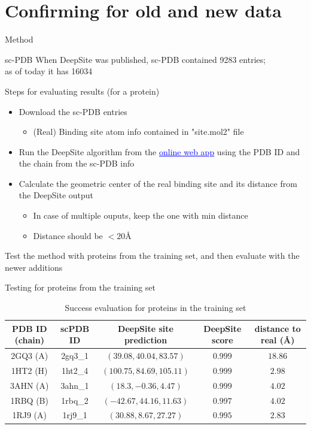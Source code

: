 \documentclass{beamer}
\newcommand{\link}[2]{\href{#1}{\textcolor{blue}{\underline{#2}}}}
\begin{document}
\section{Confirming for old and new data}

\begin{frame}{Method}
  \begin{block}{sc-PDB}
    When DeepSite was published, sc-PDB contained 9283 entries;\\
    as of today it has 16034
  \end{block}
  \begin{block}{Steps for evaluating results (for a protein)}
    \begin{itemize}
      \item Download the sc-PDB entries
      \begin{itemize}
        \item (Real) Binding site atom info contained in "site.mol2" file
      \end{itemize}
      \item Run the DeepSite algorithm from the \link{https://www.playmolecule.com/deepsite/}{online web app} using the PDB ID and the chain from the sc-PDB info
      \item Calculate the geometric center of the real binding site and its distance from the DeepSite output
      \begin{itemize}
        \item In case of multiple ouputs, keep the one with min distance
        \item Distance should be $<20$\AA
      \end{itemize}
    \end{itemize}
    Test the method with proteins from the training set, and then evaluate with the newer additions
  \end{block}
\end{frame}

\begin{frame}{Testing for proteins from the training set}
  \begin{tiny}
  \begin{table}
  \caption{Success evaluation for proteins in the training set}
  \label{table:3}
  \begin{tabular}{ c | c | c | c | c }
    PDB ID (chain) & scPDB ID & DeepSite site prediction & DeepSite score & distance to real (\AA) \\
    \hline
    2GQ3 (A) & 2gq3\_1 & $(39.08, 40.04, 83.57)$ & $0.999$ & $18.86$ \\
    1HT2 (H) & 1ht2\_4 & $(100.75, 84.69, 105.11)$ & $0.999$ & $2.98$ \\
    3AHN (A) & 3ahn\_1 & $(18.3, -0.36, 4.47)$ & $0.999$ & $4.02$ \\
    1RBQ (B) & 1rbq\_2 & $(-42.67, 44.16, 11.63)$ & $0.997$ & $4.02$ \\
    1RJ9 (A) & 1rj9\_1 & $(30.88, 8.67, 27.27)$ & $0.995$ & $2.83$ \\
  \end{tabular}
  \end{table}
  \end{tiny}
\end{frame}
\end{document}
